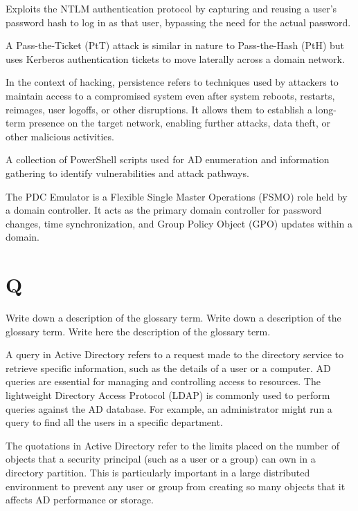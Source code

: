  Exploits the NTLM authentication protocol by capturing and reusing a user's password hash to log in as that user, bypassing the need for the actual password.

 A Pass-the-Ticket (PtT) attack is similar in nature to Pass-the-Hash (PtH) but uses Kerberos authentication tickets to move laterally across a domain network.

 In the context of hacking, persistence refers to techniques used by attackers to maintain access to a compromised system even after system reboots, restarts, reimages, user logoffs, or other disruptions. It allows them to establish a long-term presence on the target network, enabling further attacks, data theft, or other malicious activities.

 A collection of PowerShell scripts used for AD enumeration and information gathering to identify vulnerabilities and attack pathways.

 The PDC Emulator is a Flexible Single Master Operations (FSMO) role held by a domain controller. It acts as the primary domain controller for password changes, time synchronization, and Group Policy Object (GPO) updates within a domain.

\section{Q}
 Write down a description of the glossary term. Write down a description of the glossary term. Write here the description of the glossary term.

 A query in Active Directory refers to a request made to the directory service to retrieve specific information, such as the details of a user or a computer. AD queries are essential for managing and controlling access to resources. The lightweight Directory Access Protocol (LDAP) is commonly used to perform queries against the AD database. For example, an administrator might run a query to find all the users in a specific department.

 The quotations in Active Directory refer to the limits placed on the number of objects that a security principal (such as a user or a group) can own in a directory partition. This is particularly important in a large distributed environment to prevent any user or group from creating so many objects that it affects AD performance or storage.

